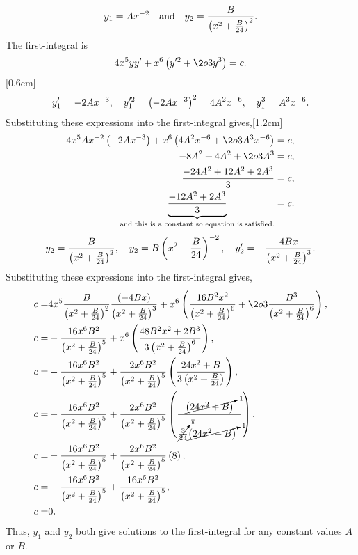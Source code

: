 \def\y1p{y_1^{\prime}}
\[
	y_1 = Ax^{-2}\quad\textrm{and}\quad y_2=\frac{B}{\left(x^2 +\frac{B}{24}\right)^2}.
\]
The first-integral is 
\[
	4 x^5yy^\prime + x^6\lr{y^{\prime2}+\2o3 y^3} = c.
\]
[0.6cm]
\[
	\y1p = -2Ax^{-3},\quad y_1^{\prime2} = \lr{-2Ax^{-3}}^2 = 4A^2x^{-6},\quad y_1^3 = A^3x^{-6}.
\]
Substituting these expressions into the first-integral gives,[1.2cm]
\begin{align*}
	4x^5Ax^{-2}\lr{-2Ax^{-3}} + x^6\lr{4A^2x^{-6} + \2o3 A^3 x^{-6}} = c,\\
	-8A^2 + 4A^2 + \2o3 A^3 = c,\\
	\frac{-24A^2 + 12A^2 + 2A^3}{3} = c,\\
	\underbrace{\frac{-12A^2+2A^3}{3}}_\textrm{and this is a constant so equation is satisfied.} = c.
\end{align*}
\[
	y_2 = \frac{B}{\left(x^2 + \frac{B}{24}\right)^2},\quad y_2 = B \left(x^2 + \frac{B}{24}\right)^{-2},\quad y_2^\prime = -\frac{4Bx}{\left(x^2 + \frac{B}{24}\right)^3}.
\]
Substituting these expressions into the first-integral gives,
\begin{align*}
	c=& 4x^5\frac{B}{\lr{x^2 + \frac{B}{24}}^2}\frac{\lr{-4Bx}}{\lr{x^2 + \frac{B}{24}}^3} + x^6\lr{\frac{16B^2x^2}{\lr{x^2 + \frac{B}{24}}^6} + \2o3\frac{B^3}{\lr{x^2 + \frac{B}{24}}^6}},\\
	c=& -\frac{16x^6B^2}{\lr{x^2 + \frac{B}{24}}^5} + x^6\lr{\frac{48B^2x^2 + 2B^3}{3\lr{x^2 + \frac{B}{24}}^6}},\\
	c=& -\frac{16x^6B^2}{\lr{x^2 + \frac{B}{24}}^5} + \frac{2x^6B^2}{\lr{x^2 + \frac{B}{24}}^5}\lr{\frac{24x^2 + B}{3\lr{x^2 + \frac{B}{24}}}},\\
	c=& -\frac{16x^6B^2}{\lr{x^2 + \frac{B}{24}}^5} + \frac{2x^6B^2}{\lr{x^2 + \frac{B}{24}}^5}\lr{\frac{\cancelto{1}{\lr{24x^2 + B}}}{\cancelto{\frac{1}{8}}{\frac{3}{24}}\cancelto{1}{\lr{24x^2 + B}}\,\,\,}},\\
	c=& -\frac{16x^6B^2}{\lr{x^2 + \frac{B}{24}}^5}  + \frac{2x^6B^2}{\lr{x^2 + \frac{B}{24}}^5}\lr{8},\\
	c=& -\frac{16x^6B^2}{\lr{x^2 + \frac{B}{24}}^5}  + \frac{16x^6B^2}{\lr{x^2 + \frac{B}{24}}^5},\\
	c=& 0.
\end{align*}
Thus, $y_1$ and $y_2$ both give solutions to the first-integral for any constant values $A$ or $B$.

